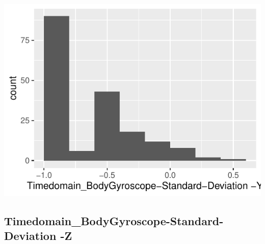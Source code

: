 \documentclass[
]{article}
\begin{document}
\begin{minipage}{0.25 \textwidth}

\includegraphics{codebook_tidydatasub_files/figure-latex/Var-25-Timedomain-BodyGyroscope-Standard-Deviation--Y-1.pdf}

\end{minipage}

\noindent\makebox[\linewidth]{\rule{\textwidth}{0.4pt}}

\hypertarget{timedomain_bodygyroscope-standard-deviation--z}{%
\subsection{Timedomain\_BodyGyroscope-Standard-Deviation
-Z}\label{timedomain_bodygyroscope-standard-deviation--z}}
\end{document}
